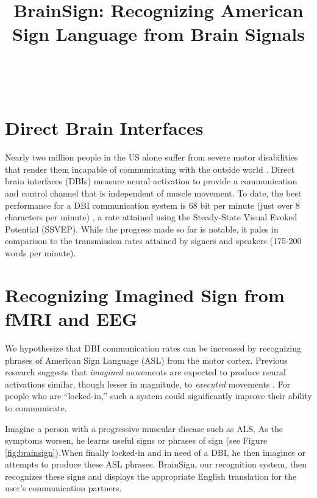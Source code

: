 \documentclass{proposal}
\title{BrainSign:  Recognizing American Sign Language from Brain Signals}
\begin{document}
\maketitle

\\

\section{Direct Brain Interfaces}

Nearly two million people in the US alone suffer from severe motor disabilities that render them incapable of communicating with the outside world \cite{ficke1992ddp, NABMRR1992, murray1997gmd, carter1997rmn}. Direct brain interfaces (DBIs) measure neural activation to provide a communication and control channel that is independent of muscle movement. To date, the best performance for a DBI communication system is 68 bit per minute (just over 8 characters per minute) \cite{gao2003bbe}, a rate attained using the Steady-State Visual Evoked Potential (SSVEP). While the progress made so far is notable, it pales in comparison to the transmission rates attained by signers and speakers (175-200 words per minute).

\section{Recognizing Imagined Sign from fMRI and EEG}

We hypothesize that DBI communication rates can be increased by recognizing phrases of American Sign Language (ASL) from the motor cortex.  Previous research suggests that \textit{imagined} movements are expected to produce neural activations similar, though lesser in magnitude, to \textit{executed} movements \cite{beisteiner1995mrm,pfurtscheller1997mia, lang1996eam,lotze1999aac}. For people who are ``locked-in,'' such a system could significantly improve their ability to communicate.

Imagine a person with a progressive muscular disease such as ALS.  As the symptoms worsen, he learns useful signs or phrases of sign (see Figure \ref{fig:brainsign}).When finally locked-in and in need of a DBI, he then imagines or attempts to produce these ASL phrases. BrainSign, our recognition system, then recognizes these signs and displays the appropriate English translation for the user's communication partners.

\end{document}
